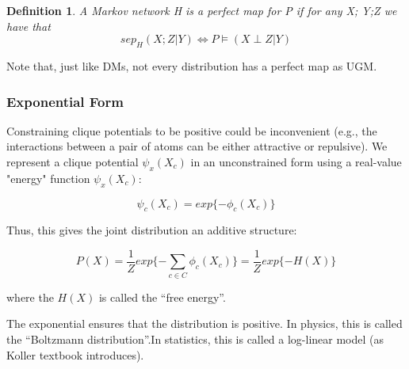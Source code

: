 \documentclass[twoside]{article}
\newtheorem{Defn}{Definition}[section]
\begin{document}
\begin{Defn}
A Markov network H is a perfect map for P if for any X; Y;Z we have that
\begin{equation}
sep_H(X;Z|Y) \Leftrightarrow P \models (X\perp Z|Y)
\end{equation}
\end{Defn}

Note that, just like DMs, not every distribution has a perfect map as UGM.

\subsubsection{Exponential Form}

Constraining clique potentials to be positive could be inconvenient (e.g., the interactions between a pair of atoms can be either attractive or repulsive). We represent a clique potential \(\psi_x(X_c)\) in an unconstrained form using a real-value "energy" function \(\psi_x(X_c)\):

\begin{equation}
\psi_c(X_c) = exp\{-\phi_c(X_c)\}
\end{equation}

Thus, this gives the joint distribution an additive structure:

\begin{equation}
P(X)=\frac{1}{Z}exp\{-\sum_{c\in C}\phi_c(X_c)\} = \frac{1}{Z}exp\{-H(X)\}
\end{equation}

where the \(H(X)\) is called the ``free energy''.

The exponential ensures that the distribution is positive. In physics, this is called the ``Boltzmann distribution''.In statistics, this is called a log-linear model (as Koller textbook introduces).
\end{document}
